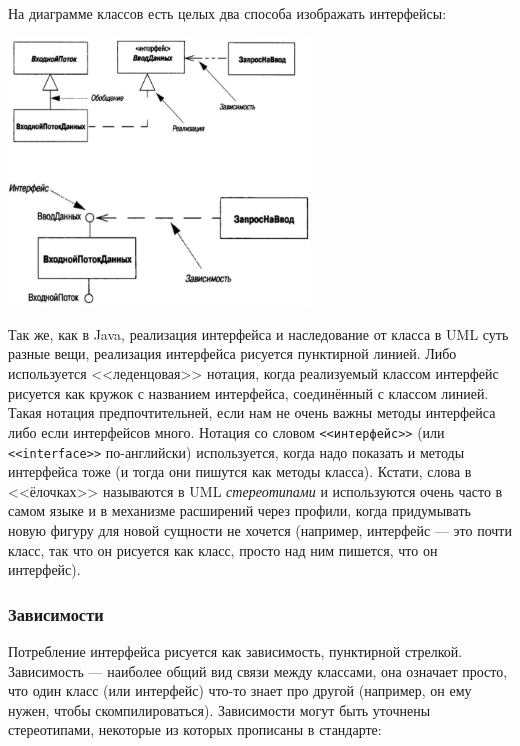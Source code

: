 \documentclass{../text-style}
\begin{document}
На диаграмме классов есть целых два способа изображать интерфейсы: 

\begin{center}
    \includegraphics[width=0.6\textwidth]{interfaces.png}
\end{center}

Так же, как в Java, реализация интерфейса и наследование от класса в UML суть разные вещи, реализация интерфейса рисуется пунктирной линией. Либо используется <<леденцовая>> нотация, когда реализуемый классом интерфейс рисуется как кружок с названием интерфейса, соединённый с классом линией. Такая нотация предпочтительней, если нам не очень важны методы интерфейса либо если интерфейсов много. Нотация со словом \verb|<<интерфейс>>| (или \verb|<<interface>>| по-английски) используется, когда надо показать и методы интерфейса тоже (и тогда они пишутся как методы класса). Кстати, слова в <<ёлочках>> называются в UML \textit{стереотипами} и используются очень часто в самом языке и в механизме расширений через профили, когда придумывать новую фигуру для новой сущности не хочется (например, интерфейс --- это почти класс, так что он рисуется как класс, просто над ним пишется, что он интерфейс).

\subsubsection{Зависимости}

Потребление интерфейса рисуется как зависимость, пунктирной стрелкой. Зависимость --- наиболее общий вид связи между классами, она означает просто, что один класс (или интерфейс) что-то знает про другой (например, он ему нужен, чтобы скомпилироваться). Зависимости могут быть уточнены стереотипами, некоторые из которых прописаны в стандарте:
\end{document}
